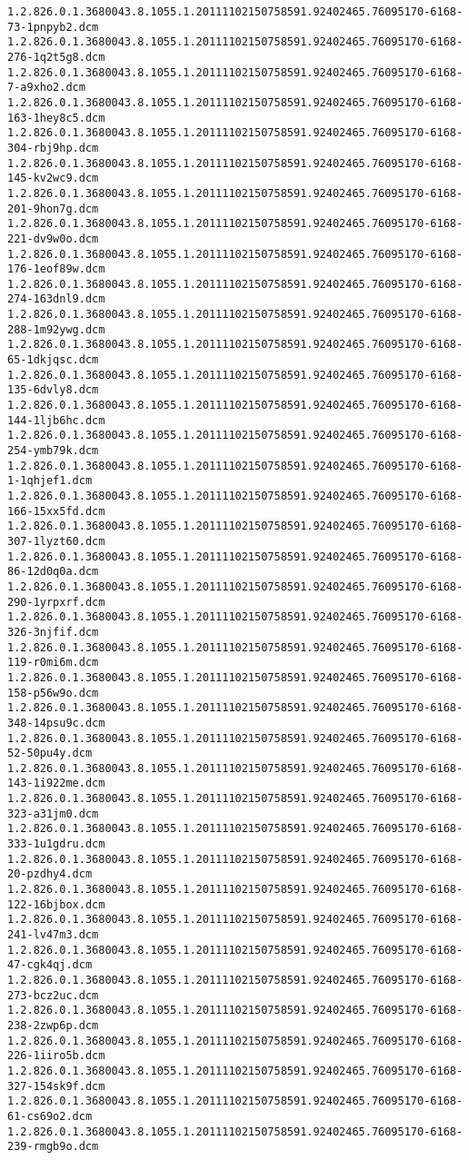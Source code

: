 \begin{lstlisting}
1.2.826.0.1.3680043.8.1055.1.20111102150758591.92402465.76095170-6168-73-1pnpyb2.dcm 1.2.826.0.1.3680043.8.1055.1.20111102150758591.92402465.76095170-6168-276-1q2t5g8.dcm 1.2.826.0.1.3680043.8.1055.1.20111102150758591.92402465.76095170-6168-7-a9xho2.dcm 1.2.826.0.1.3680043.8.1055.1.20111102150758591.92402465.76095170-6168-163-1hey8c5.dcm 1.2.826.0.1.3680043.8.1055.1.20111102150758591.92402465.76095170-6168-304-rbj9hp.dcm 1.2.826.0.1.3680043.8.1055.1.20111102150758591.92402465.76095170-6168-145-kv2wc9.dcm 1.2.826.0.1.3680043.8.1055.1.20111102150758591.92402465.76095170-6168-201-9hon7g.dcm 1.2.826.0.1.3680043.8.1055.1.20111102150758591.92402465.76095170-6168-221-dv9w0o.dcm 1.2.826.0.1.3680043.8.1055.1.20111102150758591.92402465.76095170-6168-176-1eof89w.dcm 1.2.826.0.1.3680043.8.1055.1.20111102150758591.92402465.76095170-6168-274-163dnl9.dcm 1.2.826.0.1.3680043.8.1055.1.20111102150758591.92402465.76095170-6168-288-1m92ywg.dcm 1.2.826.0.1.3680043.8.1055.1.20111102150758591.92402465.76095170-6168-65-1dkjqsc.dcm 1.2.826.0.1.3680043.8.1055.1.20111102150758591.92402465.76095170-6168-135-6dvly8.dcm 1.2.826.0.1.3680043.8.1055.1.20111102150758591.92402465.76095170-6168-144-1ljb6hc.dcm 1.2.826.0.1.3680043.8.1055.1.20111102150758591.92402465.76095170-6168-254-ymb79k.dcm 1.2.826.0.1.3680043.8.1055.1.20111102150758591.92402465.76095170-6168-1-1qhjef1.dcm 1.2.826.0.1.3680043.8.1055.1.20111102150758591.92402465.76095170-6168-166-15xx5fd.dcm 1.2.826.0.1.3680043.8.1055.1.20111102150758591.92402465.76095170-6168-307-1lyzt60.dcm 1.2.826.0.1.3680043.8.1055.1.20111102150758591.92402465.76095170-6168-86-12d0q0a.dcm 1.2.826.0.1.3680043.8.1055.1.20111102150758591.92402465.76095170-6168-290-1yrpxrf.dcm 1.2.826.0.1.3680043.8.1055.1.20111102150758591.92402465.76095170-6168-326-3njfif.dcm 1.2.826.0.1.3680043.8.1055.1.20111102150758591.92402465.76095170-6168-119-r0mi6m.dcm 1.2.826.0.1.3680043.8.1055.1.20111102150758591.92402465.76095170-6168-158-p56w9o.dcm 1.2.826.0.1.3680043.8.1055.1.20111102150758591.92402465.76095170-6168-348-14psu9c.dcm 1.2.826.0.1.3680043.8.1055.1.20111102150758591.92402465.76095170-6168-52-50pu4y.dcm 1.2.826.0.1.3680043.8.1055.1.20111102150758591.92402465.76095170-6168-143-1i922me.dcm 1.2.826.0.1.3680043.8.1055.1.20111102150758591.92402465.76095170-6168-323-a31jm0.dcm 1.2.826.0.1.3680043.8.1055.1.20111102150758591.92402465.76095170-6168-333-1u1gdru.dcm 1.2.826.0.1.3680043.8.1055.1.20111102150758591.92402465.76095170-6168-20-pzdhy4.dcm 1.2.826.0.1.3680043.8.1055.1.20111102150758591.92402465.76095170-6168-122-16bjbox.dcm 1.2.826.0.1.3680043.8.1055.1.20111102150758591.92402465.76095170-6168-241-lv47m3.dcm 1.2.826.0.1.3680043.8.1055.1.20111102150758591.92402465.76095170-6168-47-cgk4qj.dcm 1.2.826.0.1.3680043.8.1055.1.20111102150758591.92402465.76095170-6168-273-bcz2uc.dcm 1.2.826.0.1.3680043.8.1055.1.20111102150758591.92402465.76095170-6168-238-2zwp6p.dcm 1.2.826.0.1.3680043.8.1055.1.20111102150758591.92402465.76095170-6168-226-1iiro5b.dcm 1.2.826.0.1.3680043.8.1055.1.20111102150758591.92402465.76095170-6168-327-154sk9f.dcm 1.2.826.0.1.3680043.8.1055.1.20111102150758591.92402465.76095170-6168-61-cs69o2.dcm 1.2.826.0.1.3680043.8.1055.1.20111102150758591.92402465.76095170-6168-239-rmgb9o.dcm 
\end{lstlisting}
